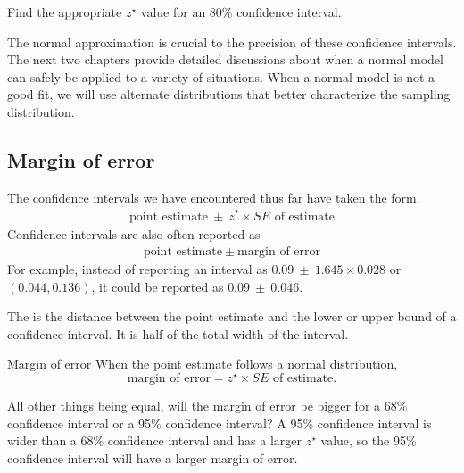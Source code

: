 \begin{exercisewrap}
\begin{nexercise} \label{find90CIForRun10AgeExercise}
Find the appropriate $z^{\star}$ value for an 80\% confidence interval.\footnotemark
\end{nexercise}
\end{exercisewrap}

The normal approximation is crucial to the precision of these confidence intervals. The next two chapters provide detailed discussions about when a normal model can safely be applied to a variety of situations. When a normal model is not a good fit, we will use alternate distributions that better characterize the sampling distribution.

\subsection{Margin of error}

The confidence intervals we have encountered thus far have taken the form
\begin{align*}
\text{point estimate} \ \pm \ z^*\times SE \text{ of estimate}
\end{align*}
Confidence intervals are also often reported as 
\begin{align*}
\text{point estimate} \ \pm \ \text{margin of error}
\end{align*}
For example, instead of reporting an interval as $0.09 \ \pm  \ 1.645\times 0.028$ or $(0.044, 0.136)$, it could be reported as $0.09 \ \pm \  0.046$.

The  is the distance between the point estimate and the lower or upper bound of a confidence interval.  It is half of the total width of the interval.

\begin{onebox}{Margin of error}\label{marginOfErrorTermBox}
When the point estimate follows a normal distribution, 
$$ \text{margin of error} = z^{\star}\times SE \text{ of estimate}.$$
\end{onebox}

\D{\newpage}

\begin{examplewrap}
\begin{nexample}{All other things being equal, will the margin of error be bigger for a 68\% confidence interval or a 95\% confidence interval?}
A 95\% confidence interval is wider than a 68\% confidence interval and has a larger $z^{\star}$ value, so the 95\% confidence interval will have a larger margin of error.
\end{nexample}
\end{examplewrap}


